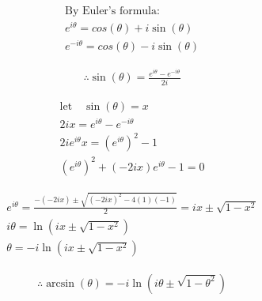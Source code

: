 \documentclass{../style}
\begin{document}
\begin{gather*}
	\text{By Euler's formula:} \\
	e^{i\theta} = cos(\theta) + i\sin(\theta) \\
	e^{-i\theta} = cos(\theta) - i\sin(\theta)
\end{gather*}

\begin{gather*}
	\therefore \sin(\theta) = \frac{e^{i\theta} - e^{-i\theta}}{2i}
\end{gather*}

\begin{gather*}
	\text{let} \quad \sin(\theta) = x \\
	2ix = e^{i\theta} - e^{-i\theta} \\
	2ie^{i\theta}x = (e^{i\theta})^2 - 1 \\ 
	(e^{i\theta})^2 + (-2ix)e^{i\theta} - 1 = 0
\end{gather*}

\begin{gather*}
	e^{i\theta} = \frac{-(-2ix) \pm \sqrt{(-2ix)^2 - 4(1)(-1)}}{2} = ix \pm \sqrt{1 - x^2} \\
	i\theta = \ln(ix \pm \sqrt{1 - x^2}) \\
	\theta = -i\ln(ix \pm \sqrt{1 - x^2})
\end{gather*}

\begin{gather*}
	\therefore \arcsin(\theta) = -i\ln(i\theta \pm \sqrt{1 -\theta^2})
\end{gather*}
\end{document}
